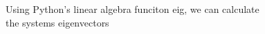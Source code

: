 \documentclass[preview]{standalone}
\begin{document}
\begin{center}
Using Python's linear algebra funciton eig, we can calculate \\
                the systems eigenvectors
\end{center}
\end{document}
